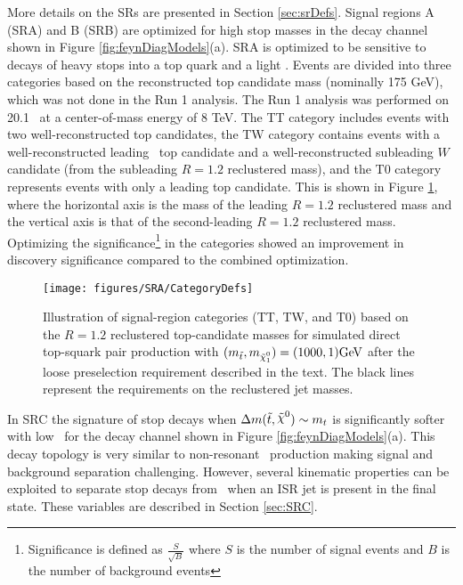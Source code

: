 More details on the SRs are presented in Section \ref{sec:srDefs}.  Signal regions A (SRA) and B (SRB) are optimized for high stop masses in the decay channel shown in Figure \ref{fig:feynDiagModels}(a).  SRA is optimized to be sensitive to decays of heavy stops into a top quark and a light \LSP. Events are divided into three categories based on the reconstructed top candidate mass (nominally 175 GeV), which was not done in the Run 1 analysis\cite{stop0LRun1}. The Run 1 analysis was performed on 20.1 \ifb\ at a center-of-mass energy of 8 TeV.  The TT category includes events with two well-reconstructed top candidates, the TW category contains events with a well-reconstructed leading \pt\ top candidate and a well-reconstructed subleading $W$ candidate (from the subleading $R=1.2$ reclustered mass), and the T0 category represents events with only a leading top candidate. This is shown in Figure \ref{fig:categories}, where the horizontal axis is the mass of the leading $R=1.2$ reclustered mass and the vertical axis is that of the second-leading $R=1.2$ reclustered mass. Optimizing the significance\footnote{Significance is defined as $\frac{S}{\sqrt{B}}$ where $S$ is the number of signal events and $B$ is the number of background events} in the categories showed an improvement in discovery significance compared to the combined optimization. \\


\begin{figure}[t]
  \begin{center}
    \texttt{[image: figures/SRA/CategoryDefs]}
    \caption[Top quark mass categories.]{Illustration of signal-region categories (TT, TW, and T0) based on the $R=1.2$ reclustered top-candidate masses for simulated direct top-squark pair production with $(m_{\stop},m_{\ninoone})=(1000,1) \GeV$ after the loose preselection requirement described in the text. The black lines represent the requirements on the reclustered jet masses.}
    \label{fig:categories}
  \end{center}
\end{figure}

In SRC the signature of stop decays when $\Delta m(\stop,\LSP)\sim m_{t}$ is significantly softer with low \met\ for the decay channel shown in Figure \ref{fig:feynDiagModels}(a). This decay topology is very similar to non-resonant \ttbar\ production making signal and background separation challenging. However, several kinematic properties can be exploited to separate stop decays from \ttbar\ when an ISR jet is present in the final state. These variables are described in Section \ref{sec:SRC}. \\

